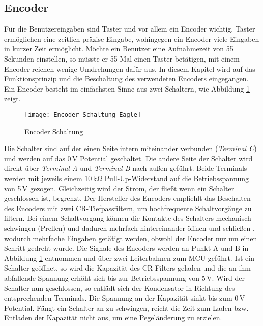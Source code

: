 
\subsection{Encoder}
\label{sec:Encoder}
Für die Benutzereingaben sind Taster und vor allem ein Encoder wichtig. Taster ermöglichen eine zeitlich präzise Eingabe, wohingegen ein Encoder viele Eingaben in kurzer Zeit ermöglicht. Möchte ein Benutzer eine Aufnahmezeit von 55 Sekunden einstellen, so müsste er 55 Mal einen Taster betätigen, mit einem Encoder reichen wenige Umdrehungen dafür aus. In diesem Kapitel wird auf das Funktionsprinzip und die Beschaltung des verwendeten Encoders eingegangen.\\
Ein Encoder besteht im einfachsten Sinne aus zwei Schaltern, wie Abbildung \ref{fig:Encoder-Schaltung} zeigt. 
\begin{figure}[h]
	\begin{center}
		\texttt{[image: Encoder-Schaltung-Eagle]}
		\caption{Encoder Schaltung \cite{EncoderMN}}
		\label{fig:Encoder-Schaltung}
	\end{center}
\end{figure}
Die Schalter sind auf der einen Seite intern miteinander verbunden (\textit{Terminal C}) und werden auf das 0\,V Potential geschaltet. Die andere Seite der Schalter wird direkt über \textit{Terminal A} und \textit{Terminal B} nach außen geführt. 
Beide Terminals werden mit jeweils einem 10\,k$\Omega$ Pull-Up-Widerstand auf die Betriebsspannung von 5\,V gezogen. Gleichzeitig wird der Strom, der fließt wenn ein Schalter geschlossen ist, begrenzt. Der Hersteller des Encoders empfiehlt das Beschalten des Encoders mit zwei CR-Tiefpassfiltern, um hochfrequente Schaltvorgänge zu filtern. Bei einem Schaltvorgang können die Kontakte des Schalters mechanisch schwingen (Prellen) und dadurch mehrfach hintereinander öffnen und schließen \cite[S. 67]{TechInfo}, wodurch mehrfache Eingaben getätigt werden, obwohl der Encoder nur um einen Schritt gedreht wurde. Die Signale des Encoders werden an Punkt A und B in Abbildung \ref{fig:Encoder-Schaltung} entnommen und über zwei Leiterbahnen zum MCU geführt. Ist ein Schalter geöffnet, so wird die Kapazität des CR-Filters geladen und die an ihm abfallende Spannung erhöht sich bis zur Betriebsspannung von 5\,V. Wird der Schalter nun geschlossen, so entlädt sich der Kondensator in Richtung des entsprechenden Terminals. Die Spannung an der Kapazität sinkt bis zum 0\,V-Potential. Fängt ein Schalter an zu schwingen, reicht die Zeit zum Laden bzw. Entladen der Kapazität nicht aus, um eine Pegeländerung zu erzielen. 
